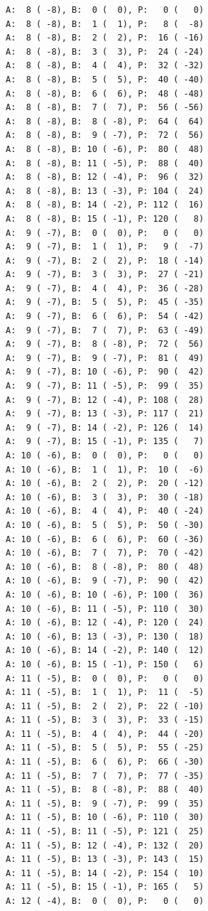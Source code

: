 \documentclass[12pt, titlepage]{report}
\begin{document}
\begin{framed}
\begin{verbatim}
A:  8 ( -8), B:  0 (  0), P:   0 (   0)
A:  8 ( -8), B:  1 (  1), P:   8 (  -8)
A:  8 ( -8), B:  2 (  2), P:  16 ( -16)
A:  8 ( -8), B:  3 (  3), P:  24 ( -24)
A:  8 ( -8), B:  4 (  4), P:  32 ( -32)
A:  8 ( -8), B:  5 (  5), P:  40 ( -40)
A:  8 ( -8), B:  6 (  6), P:  48 ( -48)
A:  8 ( -8), B:  7 (  7), P:  56 ( -56)
A:  8 ( -8), B:  8 ( -8), P:  64 (  64)
A:  8 ( -8), B:  9 ( -7), P:  72 (  56)
A:  8 ( -8), B: 10 ( -6), P:  80 (  48)
A:  8 ( -8), B: 11 ( -5), P:  88 (  40)
A:  8 ( -8), B: 12 ( -4), P:  96 (  32)
A:  8 ( -8), B: 13 ( -3), P: 104 (  24)
A:  8 ( -8), B: 14 ( -2), P: 112 (  16)
A:  8 ( -8), B: 15 ( -1), P: 120 (   8)
A:  9 ( -7), B:  0 (  0), P:   0 (   0)
A:  9 ( -7), B:  1 (  1), P:   9 (  -7)
A:  9 ( -7), B:  2 (  2), P:  18 ( -14)
A:  9 ( -7), B:  3 (  3), P:  27 ( -21)
A:  9 ( -7), B:  4 (  4), P:  36 ( -28)
A:  9 ( -7), B:  5 (  5), P:  45 ( -35)
A:  9 ( -7), B:  6 (  6), P:  54 ( -42)
A:  9 ( -7), B:  7 (  7), P:  63 ( -49)
A:  9 ( -7), B:  8 ( -8), P:  72 (  56)
A:  9 ( -7), B:  9 ( -7), P:  81 (  49)
A:  9 ( -7), B: 10 ( -6), P:  90 (  42)
A:  9 ( -7), B: 11 ( -5), P:  99 (  35)
A:  9 ( -7), B: 12 ( -4), P: 108 (  28)
A:  9 ( -7), B: 13 ( -3), P: 117 (  21)
A:  9 ( -7), B: 14 ( -2), P: 126 (  14)
A:  9 ( -7), B: 15 ( -1), P: 135 (   7)
A: 10 ( -6), B:  0 (  0), P:   0 (   0)
A: 10 ( -6), B:  1 (  1), P:  10 (  -6)
A: 10 ( -6), B:  2 (  2), P:  20 ( -12)
A: 10 ( -6), B:  3 (  3), P:  30 ( -18)
A: 10 ( -6), B:  4 (  4), P:  40 ( -24)
A: 10 ( -6), B:  5 (  5), P:  50 ( -30)
A: 10 ( -6), B:  6 (  6), P:  60 ( -36)
A: 10 ( -6), B:  7 (  7), P:  70 ( -42)
A: 10 ( -6), B:  8 ( -8), P:  80 (  48)
A: 10 ( -6), B:  9 ( -7), P:  90 (  42)
A: 10 ( -6), B: 10 ( -6), P: 100 (  36)
A: 10 ( -6), B: 11 ( -5), P: 110 (  30)
A: 10 ( -6), B: 12 ( -4), P: 120 (  24)
A: 10 ( -6), B: 13 ( -3), P: 130 (  18)
A: 10 ( -6), B: 14 ( -2), P: 140 (  12)
A: 10 ( -6), B: 15 ( -1), P: 150 (   6)
A: 11 ( -5), B:  0 (  0), P:   0 (   0)
A: 11 ( -5), B:  1 (  1), P:  11 (  -5)
A: 11 ( -5), B:  2 (  2), P:  22 ( -10)
A: 11 ( -5), B:  3 (  3), P:  33 ( -15)
A: 11 ( -5), B:  4 (  4), P:  44 ( -20)
A: 11 ( -5), B:  5 (  5), P:  55 ( -25)
A: 11 ( -5), B:  6 (  6), P:  66 ( -30)
A: 11 ( -5), B:  7 (  7), P:  77 ( -35)
A: 11 ( -5), B:  8 ( -8), P:  88 (  40)
A: 11 ( -5), B:  9 ( -7), P:  99 (  35)
A: 11 ( -5), B: 10 ( -6), P: 110 (  30)
A: 11 ( -5), B: 11 ( -5), P: 121 (  25)
A: 11 ( -5), B: 12 ( -4), P: 132 (  20)
A: 11 ( -5), B: 13 ( -3), P: 143 (  15)
A: 11 ( -5), B: 14 ( -2), P: 154 (  10)
A: 11 ( -5), B: 15 ( -1), P: 165 (   5)
A: 12 ( -4), B:  0 (  0), P:   0 (   0)

\end{verbatim}
\end{framed}
\end{document}
